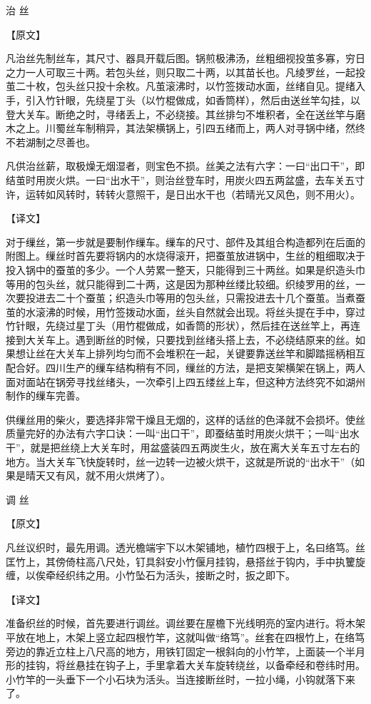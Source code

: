 \documentclass[12pt,UTF8]{ctexbook}
\begin{document}
治 丝

【原文】

凡治丝先制丝车，其尺寸、器具开载后图。锅煎极沸汤，丝粗细视投茧多寡，穷日之力一人可取三十两。若包头丝，则只取二十两，以其苗长也。凡绫罗丝，一起投茧二十枚，包头丝只投十余枚。凡茧滚沸时，以竹签拨动水面，丝绪自见。提绪入手，引入竹针眼，先绕星丁头（以竹棍做成，如香筒样），然后由送丝竿勾挂，以登大关车。断绝之时，寻绪丢上，不必绕接。其丝排匀不堆积者，全在送丝竿与磨木之上。川蜀丝车制稍异，其法架横锅上，引四五绪而上，两人对寻锅中绪，然终不若湖制之尽善也。

凡供治丝薪，取极燥无烟湿者，则宝色不损。丝美之法有六字：一曰“出口干”，即结茧时用炭火烘。一曰“出水干”，则治丝登车时，用炭火四五两盆盛，去车关五寸许，运转如风转时，转转火意照干，是日出水干也（若晴光又风色，则不用火）。

【译文】

对于缫丝，第一步就是要制作缫车。缫车的尺寸、部件及其组合构造都列在后面的附图上。缫丝时首先要将锅内的水烧得滚开，把蚕茧放进锅中，生丝的粗细取决于投入锅中的蚕茧的多少。一个人劳累一整天，只能得到三十两丝。如果是织造头巾等用的包头丝，就只能得到二十两，这是因为那种丝缕比较细。织绫罗用的丝，一次要投进去二十个蚕茧；织造头巾等用的包头丝，只需投进去十几个蚕茧。当煮蚕茧的水滚沸的时候，用竹签拨动水面，丝头自然就会出现。将丝头提在手中，穿过竹针眼，先绕过星丁头（用竹棍做成，如香筒的形状），然后挂在送丝竿上，再连接到大关车上。遇到断丝的时候，只要找到丝绪头搭上去，不必绕结原来的丝。如果想让丝在大关车上排列均匀而不会堆积在一起，关键要靠送丝竿和脚踏摇柄相互配合好。四川生产的缫车结构稍有不同，缫丝的方法，是把支架横架在锅上，两人面对面站在锅旁寻找丝绪头，一次牵引上四五缕丝上车，但这种方法终究不如湖州制作的缫车完善。

供缫丝用的柴火，要选择非常干燥且无烟的，这样的话丝的色泽就不会损坏。使丝质量完好的办法有六字口诀：一叫“出口干”，即蚕结茧时用炭火烘干；一叫“出水干”，就是把丝绕上大关车时，用盆盛装四五两炭生火，放在离大关车五寸左右的地方。当大关车飞快旋转时，丝一边转一边被火烘干，这就是所说的“出水干”（如果是晴天又有风，就不用火烘烤了）。

调 丝

【原文】

凡丝议织时，最先用调。透光檐端宇下以木架铺地，植竹四根于上，名曰络笃。丝匡竹上，其傍倚柱高八尺处，钉具斜安小竹偃月挂钩，悬搭丝于钩内，手中执籰旋缠，以俟牵经织纬之用。小竹坠石为活头，接断之时，扳之即下。

【译文】

准备织丝的时候，首先要进行调丝。调丝要在屋檐下光线明亮的室内进行。将木架平放在地上，木架上竖立起四根竹竿，这就叫做“络笃”。丝套在四根竹上，在络笃旁边的靠近立柱上八尺高的地方，用铁钉固定一根斜向的小竹竿，上面装一个半月形的挂钩，将丝悬挂在钩子上，手里拿着大关车旋转绕丝，以备牵经和卷纬时用。小竹竿的一头垂下一个小石块为活头。当连接断丝时，一拉小绳，小钩就落下来了。
\end{document}
